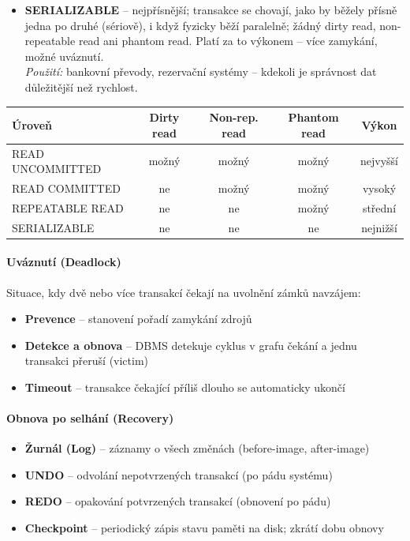 \begin{itemize}
\begin{itemize}
      \item \textbf{SERIALIZABLE} -- nejpřísnější; transakce se chovají, jako by běžely přísně
        jedna po druhé (sériově), i když fyzicky běží paralelně; žádný dirty read, non-repeatable
        read ani phantom read. Platí za to výkonem -- více zamykání, možné uváznutí. \\
        \textit{Použití:} bankovní převody, rezervační systémy -- kdekoli je správnost dat
        důležitější než rychlost.
    \end{itemize}

    \begin{center}
    \begin{tabular}{lcccc}
    \toprule
    \textbf{Úroveň} & \textbf{Dirty read} & \textbf{Non-rep. read} & \textbf{Phantom read} & \textbf{Výkon} \\
    \midrule
    READ UNCOMMITTED & možný   & možný   & možný   & nejvyšší \\
    READ COMMITTED   & ne      & možný   & možný   & vysoký \\
    REPEATABLE READ  & ne      & ne      & možný   & střední \\
    SERIALIZABLE     & ne      & ne      & ne      & nejnižší \\
    \bottomrule
    \end{tabular}
    \end{center}
\end{itemize}

\paragraph{Uváznutí (Deadlock)}
Situace, kdy dvě nebo více transakcí čekají na uvolnění zámků navzájem:
\begin{itemize}
  \item \textbf{Prevence} -- stanovení pořadí zamykání zdrojů
  \item \textbf{Detekce a obnova} -- DBMS detekuje cyklus v grafu čekání a jednu transakci přeruší (victim)
  \item \textbf{Timeout} -- transakce čekající příliš dlouho se automaticky ukončí
\end{itemize}

\paragraph{Obnova po selhání (Recovery)}
\begin{itemize}
  \item \textbf{Žurnál (Log)} -- záznamy o všech změnách (before-image, after-image)
  \item \textbf{UNDO} -- odvolání nepotvrzených transakcí (po pádu systému)
  \item \textbf{REDO} -- opakování potvrzených transakcí (obnovení po pádu)
  \item \textbf{Checkpoint} -- periodický zápis stavu paměti na disk; zkrátí dobu obnovy
\end{itemize}

